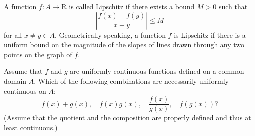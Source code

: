 \begin{exercise}
  A function $f: A \rightarrow \mathrm{R}$ is called Lipschitz if there exists a bound $M>0$ such that
  $$
  \left|\frac{f(x)-f(y)}{x-y}\right| \leq M
  $$
  for all $x \neq y \in A$. Geometrically speaking, a function $f$ is Lipschitz if there is a uniform bound on the magnitude of the slopes of lines drawn through any two points on the graph of $f$.
\end{exercise}

\begin{solution}
\end{solution}

\begin{exercise}
  Assume that $f$ and $g$ are uniformly continuous functions defined on a common domain $A$. Which of the following combinations are necessarily uniformly continuous on $A$:
  $$
  f(x)+g(x), \quad f(x) g(x), \quad \frac{f(x)}{g(x)}, \quad f(g(x)) ?
  $$
  (Assume that the quotient and the composition are properly defined and thus at least continuous.)
\end{exercise}

